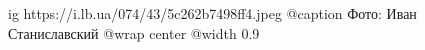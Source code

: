  
 
 
 
 

\ifcmt
  ig https://i.lb.ua/074/43/5c262b7498ff4.jpeg
	@caption Фото: Иван Станиславский
  @wrap center
  @width 0.9
\fi
